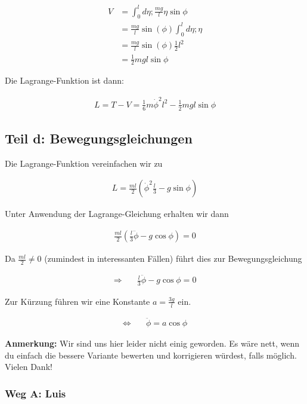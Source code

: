 \documentclass[a4paper,german,12pt,smallheadings]{scrartcl}
\begin{document}
\begin{align*}
  V &= \int_0^l d \eta; \frac{mg}{l} \eta \sin \phi \\
    &= \frac{mg}{l} \sin(\phi) \int_0^l d \eta; \eta \\
    &= \frac{mg}{l} \sin(\phi) \frac{1}{2} l^2 \\
    &= \frac{1}{2} mgl \sin \phi
\end{align*}

Die Lagrange-Funktion ist dann:

\begin{align*}
  L = T - V = \frac{1}{6} m \dot{\phi}^2 l^2 - \frac{1}{2} mgl \sin \phi
\end{align*}

\subsection*{Teil d: Bewegungsgleichungen}

Die Lagrange-Funktion vereinfachen wir zu

\begin{align*}
  L = \frac{ml}{2}\left(\dot{\phi}^2 \frac{l}{3} - g \sin \phi\right)
\end{align*}

Unter Anwendung der Lagrange-Gleichung erhalten wir dann

\begin{align*}
  \frac{ml}{2} \left(\frac{l}{3} \ddot{\phi} - g \cos \phi\right) = 0
\end{align*}

Da $\frac{ml}{2} \neq 0$ (zumindest in interessanten Fällen) führt dies zur Bewegungsgleichung

\begin{align*}
  \Rightarrow\quad&\frac{l}{3} \ddot{\phi} - g \cos \phi = 0
\end{align*}

Zur Kürzung führen wir eine Konstante $a = \frac{3g}{l}$ ein.

\begin{align*}
  \Leftrightarrow\quad&\ddot{\phi} = a \cos \phi
\end{align*}

\textbf{Anmerkung:} Wir sind uns hier leider nicht einig geworden. Es wäre
nett, wenn du einfach die bessere Variante bewerten und korrigieren würdest,
falls möglich. Vielen Dank!

\subsubsection*{Weg A: Luis}
\end{document}
